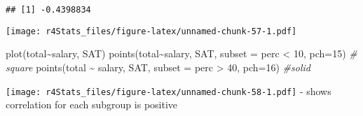 \documentclass[
]{book}
\newenvironment{Shaded}{\begin{snugshade}}{\end{snugshade}}
\newcommand{\AttributeTok}[1]{\textcolor[rgb]{0.77,0.63,0.00}{#1}}
\newcommand{\CommentTok}[1]{\textcolor[rgb]{0.56,0.35,0.01}{\textit{#1}}}
\newcommand{\DecValTok}[1]{\textcolor[rgb]{0.00,0.00,0.81}{#1}}
\newcommand{\FunctionTok}[1]{\textcolor[rgb]{0.00,0.00,0.00}{#1}}
\newcommand{\NormalTok}[1]{#1}
\newcommand{\OtherTok}[1]{\textcolor[rgb]{0.56,0.35,0.01}{#1}}
\newcommand{\SpecialCharTok}[1]{\textcolor[rgb]{0.00,0.00,0.00}{#1}}
\theoremstyle{definition}
\theoremstyle{definition}
\theoremstyle{definition}
\theoremstyle{definition}
\theoremstyle{remark}
\begin{document}
\begin{verbatim}
## [1] -0.4398834
\end{verbatim}

\begin{Shaded}
\end{Shaded}

\texttt{[image: r4Stats\_files/figure-latex/unnamed-chunk-57-1.pdf]}

\begin{Shaded}
\begin{Highlighting}[]
\FunctionTok{plot}\NormalTok{(total}\SpecialCharTok{\textasciitilde{}}\NormalTok{salary, SAT)}
\FunctionTok{points}\NormalTok{(total}\SpecialCharTok{\textasciitilde{}}\NormalTok{salary, SAT, }\AttributeTok{subset =}\NormalTok{ perc }\SpecialCharTok{\textless{}} \DecValTok{10}\NormalTok{, }\AttributeTok{pch=}\DecValTok{15}\NormalTok{)  }\CommentTok{\# square}
\FunctionTok{points}\NormalTok{(total }\SpecialCharTok{\textasciitilde{}}\NormalTok{ salary, SAT, }\AttributeTok{subset =}\NormalTok{ perc }\SpecialCharTok{\textgreater{}} \DecValTok{40}\NormalTok{, }\AttributeTok{pch=}\DecValTok{16}\NormalTok{) }\CommentTok{\#solid}
\end{Highlighting}
\end{Shaded}

\texttt{[image: r4Stats\_files/figure-latex/unnamed-chunk-58-1.pdf]}
- shows correlation for each subgroup is positive

\begin{Shaded}
\end{Shaded}
\end{document}
